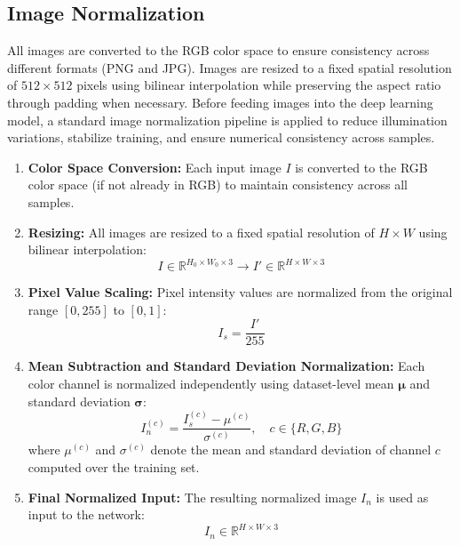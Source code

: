 \documentclass[12pt]{article}
\begin{document}
\subsection{Image Normalization}

All images are converted to the RGB color space to ensure consistency across different formats (PNG and JPG). Images are resized to a fixed spatial resolution of $512 \times 512$ pixels using bilinear interpolation while preserving the aspect ratio through padding when necessary. Before feeding images into the deep learning model, a standard image normalization
pipeline is applied to reduce illumination variations, stabilize training, and ensure
numerical consistency across samples.

\begin{enumerate}
    \item \textbf{Color Space Conversion:}
          Each input image $I$ is converted to the RGB color space (if not already in RGB)
          to maintain consistency across all samples.

    \item \textbf{Resizing:}
          All images are resized to a fixed spatial resolution of $H \times W$ using bilinear
          interpolation:
          \[
              I \in \mathbb{R}^{H_0 \times W_0 \times 3} \rightarrow I' \in \mathbb{R}^{H \times W \times 3}
          \]

    \item \textbf{Pixel Value Scaling:}
          Pixel intensity values are normalized from the original range $[0, 255]$ to
          $[0, 1]$:
          \[
              I_s = \frac{I'}{255}
          \]

    \item \textbf{Mean Subtraction and Standard Deviation Normalization:}
          Each color channel is normalized independently using dataset-level mean
          $\boldsymbol{\mu}$ and standard deviation $\boldsymbol{\sigma}$:
          \[
              I_n^{(c)} = \frac{I_s^{(c)} - \mu^{(c)}}{\sigma^{(c)}}, \quad c \in \{R, G, B\}
          \]
          where $\mu^{(c)}$ and $\sigma^{(c)}$ denote the mean and standard deviation of
          channel $c$ computed over the training set.

    \item \textbf{Final Normalized Input:}
          The resulting normalized image $I_n$ is used as input to the network:
          \[
              I_n \in \mathbb{R}^{H \times W \times 3}
          \]
\end{enumerate}
\end{document}
